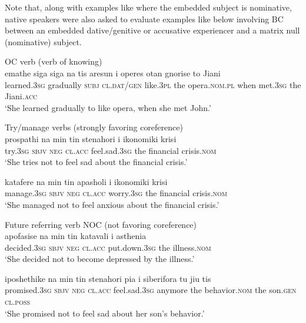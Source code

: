 \documentclass[output=paper]{langsci/langscibook}
\begin{document}
Note that, along with examples like  where the embedded subject is nominative, native speakers were also asked to evaluate examples like  below involving BC between an embedded dative\slash genitive or accusative experiencer and a matrix null (nominative) subject. 

\ea%
    \label{ex:alexiadou:15}
OC verb (verb of knowing)\\
\ea \gll emathe {siga siga} na   tis aresun i operes otan   gnorise   to Jiani\\
learned.\textsc{3sg} gradually \textsc{subj} \textsc{cl.dat\slash gen} like.\textsc{3pl} the opera.\textsc{nom.pl} when met.\textsc{3sg} the Jiani.\textsc{acc}\\
\glt ‘She learned gradually to like opera, when she met John.’

Try\slash manage verbs (strongly favoring coreference)\\

\ex \gll  prospathi   na   min   tin   stenahori   i ikonomiki krisi \\
    try.\textsc{3sg} \textsc{sbjv}  \textsc{neg}  \textsc{cl.acc} feel.sad.\textsc{3sg}  the financial crisis.\textsc{nom}\\
    \glt ‘She tries not to feel sad about the financial crisis.’

\ex\gll  katafere   na   min   tin   apasholi    i ikonomiki krisi\\
    manage.\textsc{3sg} \textsc{sbjv}  \textsc{neg}  \textsc{cl.acc} worry.\textsc{3sg} the financial crisis.\textsc{nom}\\
    \glt ‘She managed not to feel anxious about the financial crisis.’

Future referring verb NOC (not favoring coreference)  \\

\ex \gll apofasise   na   min   tin   katavali   i asthenia\\
         decided.\textsc{3sg} \textsc{sbjv}  \textsc{neg} \textsc{cl.acc}   put.down.\textsc{3sg} the illness.\textsc{nom}\\
    \glt ‘She decided not to become depressed by the illness.’

\ex \gll iposhethike   na min   tin   stenahori   pia i   siberifora    tu   jiu    tis \\
         promised.\textsc{3sg} \textsc{sbjv}  \textsc{neg}   \textsc{cl.acc}  feel.sad.\textsc{3sg} anymore the   behavior.\textsc{nom}  the    son.\textsc{gen}   \textsc{cl.poss}\\
    \glt ‘She promised not to feel sad about her son’s behavior.’
\z
\z
\end{document}
